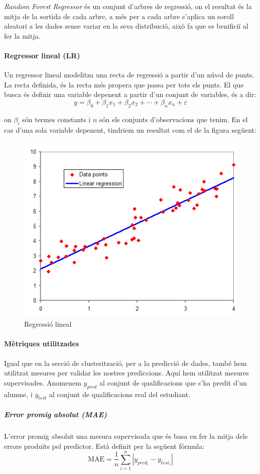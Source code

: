 \documentclass[12pt,a4paper,catalan]{article}
\begin{document}
\textit{Random Forest Regressor} \cite{randomforestregressor} és un conjunt d'arbres de regressió, on el resultat és la mitja de la sortida de cada arbre, a més per a cada arbre s'aplica un soroll aleatori a les dades sense variar en la seva distribució, això fa que es benificiï al fer la mitja. 

\newpage

\paragraph{Regressor lineal (LR)}
Un regressor lineal \cite{linearregressor} modelitza una recta de regressió a partir d'un núvol de punts. La recta definida, és la recta més propera que passa per tots els punts. El que busca és definir una variable depenent a partir d'un conjunt de variables, és a dir:
$$
y =\beta_0+\beta_1 x_1+\beta_2 x_2+ \cdots + \beta_n x_n + \varepsilon
$$

on $\beta_i$ són termes constants i $n$ són els conjunts d'observacions que tenim. En el cas d'una sola variable depenent, tindriem un resultat com el de la figura següent:

\begin{figure}[h]
\centering
\includegraphics[width=.5\linewidth]{img/linearregression.png}
\caption{Regressió lineal \cite{imglinearregressor}}
\end{figure}

\paragraph{Mètriques utilitzades}
Igual que en la secció de clusterització, per a la predicció de dades, també hem utilitzat mesures per validar les nostres prediccions. Aquí hem utilitzat mesures supervisades. Anomenem $y_{pred}$ al conjunt de qualificacions que s'ha predit d'un alumne, i $y_{test}$ al conjunt de qualificacions real del estudiant.

\subparagraph{Error promig absolut (MAE)}
L'error promig absolut \cite{mae} una mesura supervisada que és basa en fer la mitja dels errors produïts pel predictor. Està definit per la següent fórmula:
$$ \mathrm{MAE} = \frac{1}{n}\sum_{i=1}^n \left| y_{pred_i}-y_{test_i}\right| $$
\end{document}
